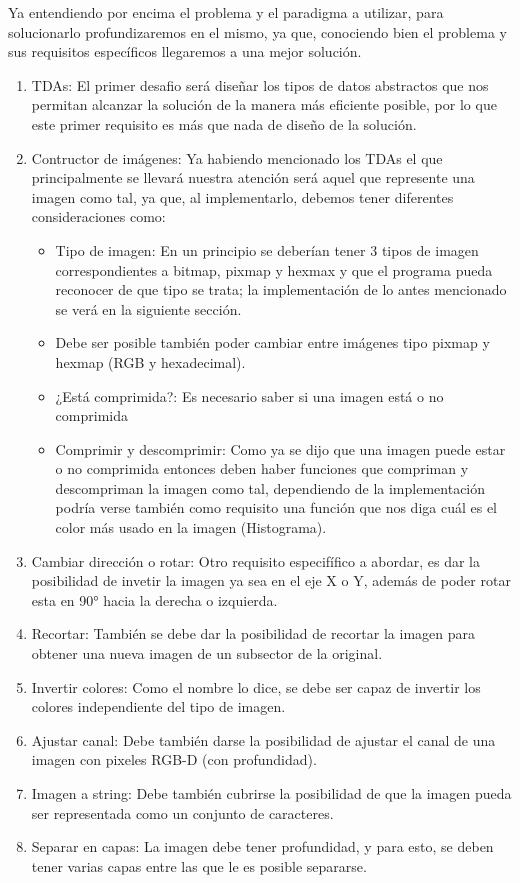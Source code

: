 Ya entendiendo  por encima el problema y el paradigma a utilizar, para solucionarlo profundizaremos
 en el mismo, ya que, conociendo bien el problema y sus requisitos específicos llegaremos
 a una mejor solución.

\begin{enumerate}
    \item TDAs: El primer desafio será diseñar los tipos de datos abstractos que nos permitan alcanzar la solución de la manera más
    eficiente posible, por lo que este primer requisito es más que nada de diseño de la solución.
    \item Contructor de imágenes: Ya habiendo mencionado los TDAs el que principalmente se llevará nuestra atención será aquel que 
    represente una imagen como tal, ya que, al implementarlo, debemos tener diferentes consideraciones como:
    \begin{itemize}
        \item Tipo de imagen: En un principio se deberían tener 3 tipos de imagen correspondientes a bitmap, pixmap y hexmax y que
        el programa pueda reconocer de que tipo se trata; la implementación de lo antes mencionado se verá en la siguiente sección.
        \item Debe ser posible también poder cambiar entre imágenes tipo pixmap y hexmap (RGB y hexadecimal).
        \item ¿Está comprimida?: Es necesario saber si una imagen está o no comprimida
        \item Comprimir y descomprimir: Como ya se dijo que una imagen puede estar o no comprimida entonces deben haber funciones que compriman
     y descompriman la imagen como tal, dependiendo de la implementación podría verse también como requisito una función que nos diga 
     cuál es el color más usado en la imagen (Histograma).
    \end{itemize}
    
    \item Cambiar dirección o rotar: Otro requisito especifífico a abordar, es dar la posibilidad de invetir la imagen ya sea en el eje X o Y, 
    además de poder rotar esta en 90° hacia la derecha o izquierda.
    \item Recortar: También se debe dar la posibilidad de recortar la imagen para obtener una nueva imagen de un subsector de la original.
    \item Invertir colores: Como el nombre lo dice, se debe ser capaz de invertir los colores independiente del tipo de imagen.
    \item Ajustar canal: Debe también darse la posibilidad de ajustar el canal de una imagen con pixeles RGB-D (con profundidad).
    \item Imagen a string: Debe también cubrirse la posibilidad de que la imagen pueda ser representada como un conjunto de caracteres.
    \item Separar en capas: La imagen debe tener profundidad, y para esto, se deben tener varias capas entre las que le es posible separarse.
\end{enumerate}
